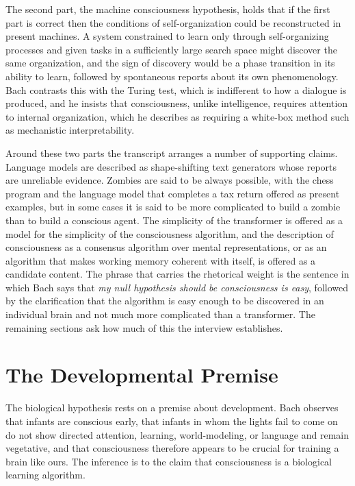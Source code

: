 \documentclass[11pt]{article}
\begin{document}
The second part, the machine consciousness hypothesis, holds that if the first part is correct then the conditions of self-organization could be reconstructed in present machines. A system constrained to learn only through self-organizing processes and given tasks in a sufficiently large search space might discover the same organization, and the sign of discovery would be a phase transition in its ability to learn, followed by spontaneous reports about its own phenomenology. Bach contrasts this with the Turing test, which is indifferent to how a dialogue is produced, and he insists that consciousness, unlike intelligence, requires attention to internal organization, which he describes as requiring a white-box method such as mechanistic interpretability.

Around these two parts the transcript arranges a number of supporting claims. Language models are described as shape-shifting text generators whose reports are unreliable evidence. Zombies are said to be always possible, with the chess program and the language model that completes a tax return offered as present examples, but in some cases it is said to be more complicated to build a zombie than to build a conscious agent. The simplicity of the transformer is offered as a model for the simplicity of the consciousness algorithm, and the description of consciousness as a consensus algorithm over mental representations, or as an algorithm that makes working memory coherent with itself, is offered as a candidate content. The phrase that carries the rhetorical weight is the sentence in which Bach says that \emph{my null hypothesis should be consciousness is easy}, followed by the clarification that the algorithm is easy enough to be discovered in an individual brain and not much more complicated than a transformer. The remaining sections ask how much of this the interview establishes.

\section{The Developmental Premise}

The biological hypothesis rests on a premise about development. Bach observes that infants are conscious early, that infants in whom the lights fail to come on do not show directed attention, learning, world-modeling, or language and remain vegetative, and that consciousness therefore appears to be crucial for training a brain like ours. The inference is to the claim that consciousness is a biological learning algorithm.
\end{document}
